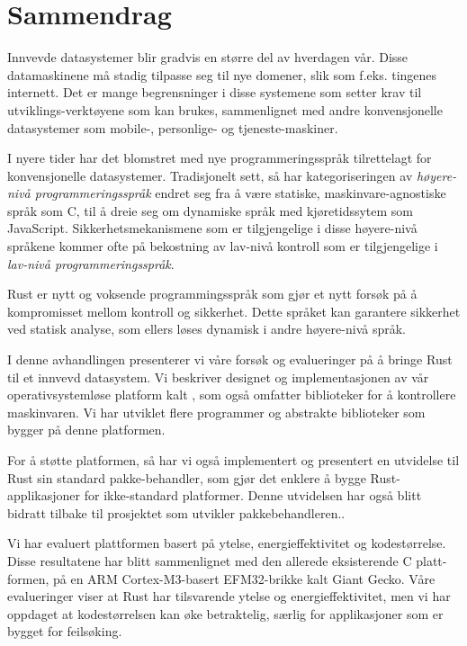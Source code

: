 
\chapter{Sammendrag}
\label{chap:sammendrag}

Innvevde datasystemer blir gradvis en større del av hverdagen vår.
Disse datamaskinene må stadig tilpasse seg til nye domener, slik som f.eks. tingenes internett.
Det er mange begrensninger i disse systemene som setter krav til utviklings-verktøyene som kan brukes, sammenlignet med andre konvensjonelle datasystemer som mobile-, personlige- og tjeneste-maskiner.

I nyere tider har det blomstret med nye programmeringsspråk tilrettelagt for konvensjonelle datasystemer.
Tradisjonelt sett, så har kategoriseringen av \emph{høyere-nivå programmeringsspråk} endret seg fra å være statiske, maskinvare-agnostiske språk som C, til å dreie seg om dynamiske språk med kjøretidssytem som JavaScript.
Sikkerhetsmekanismene som er tilgjengelige i disse høyere-nivå språkene kommer ofte på bekostning av lav-nivå kontroll som er tilgjengelige i \emph{lav-nivå programmeringsspråk}.

Rust er nytt og voksende programmingsspråk som gjør et nytt forsøk på å kompromisset mellom kontroll og sikkerhet.
Dette språket kan garantere sikkerhet ved statisk analyse, som ellers løses dynamisk i andre høyere-nivå språk.

I denne avhandlingen presenterer vi våre forsøk og evalueringer på å bringe Rust til et innvevd datasystem.
Vi beskriver designet og implementasjonen av vår operativsystemløse platform kalt {\rg}, som også omfatter biblioteker for å kontrollere maskinvaren.
Vi har utviklet flere programmer og abstrakte biblioteker som bygger på denne platformen.

For å støtte platformen, så har vi også implementert og presentert en utvidelse til Rust sin standard pakke-behandler, som gjør det enklere å bygge Rust-applikasjoner for ikke-standard platformer.
Denne utvidelsen har også blitt bidratt tilbake til prosjektet som utvikler pakkebehandleren..

Vi har evaluert plattformen basert på ytelse, energieffektivitet og kodestørrelse.
Disse resultatene har blitt sammenlignet med den allerede eksisterende C platt-formen, på en ARM Cortex-M3-basert EFM32-brikke kalt Giant Gecko.
Våre evalueringer viser at Rust har tilsvarende ytelse og energieffektivitet, men vi har oppdaget at kodestørrelsen kan øke betraktelig, særlig for applikasjoner som er bygget for feilsøking.
